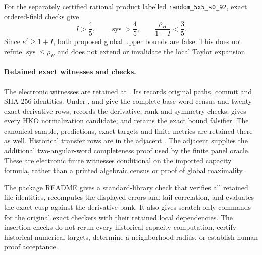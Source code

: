 For the separately certified rational product labelled
\texttt{random\_5x5\_s0\_92}, exact ordered-field checks give
\[
 I>\frac45,\qquad \operatorname{sys}>\frac45,\qquad
 \frac{\rho_H}{1+I}<\frac35.
\]
Since $e^I\geq1+I$, both proposed global upper bounds are false.
This does not refute $\operatorname{sys}\leq\rho_H$ and does not extend
or invalidate the local Taylor expansion.


\paragraph{Retained exact witnesses and checks.}
\begingroup\raggedright
The electronic witnesses are retained at
.
Its  records original paths, commit and SHA-256
identities. Under ,
 and  give the complete base
word census and twenty exact derivative rows;
 records the derivative, rank and symmetry checks;
 gives every HKO normalization candidate;
and  retains the exact bound falsifier.
The canonical sample, predictions, exact targets and finite metrics are
retained there as well. Historical transfer rows are in the adjacent
. The adjacent
 supplies the additional
two-angular-word completeness proof used by the finite panel oracle.
These are electronic finite
witnesses conditional on the imported capacity formula, rather than a
printed algebraic census or proof of global maximality.\par
\endgroup

The package README gives a standard-library check that verifies all retained
file identities, recomputes the displayed errors and tail correlation,
and evaluates the exact cusp against the derivative bank. It also gives
scratch-only commands for the original exact checkers with their retained
local dependencies. The insertion checks do not rerun every historical
capacity computation, certify historical numerical targets, determine a
neighborhood radius, or establish human proof acceptance.
